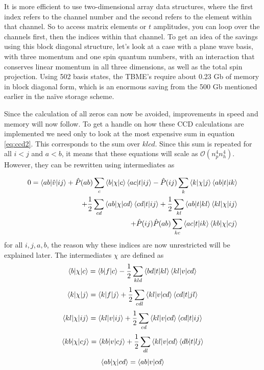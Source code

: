   It is more efficient to use two-dimensional array data
  structures, where the first index refers to the channel number and
  the second refers to the element within that channel. So to access
  matrix elements or $t$ amplitudes, you can loop over the channels
  first, then the indices within that channel. To get an idea of the
  savings using this block diagonal structure, let's look at a case
  with a plane wave basis, with three momentum and one spin quantum
  numbers, with an interaction that conserves linear momentum in all
  three dimensions, as well as the total spin projection. Using 502
  basis states, the TBME's require about 0.23 Gb of memory in block
  diagonal form, which is an enormous saving from the 500 Gb mentioned
  earlier in the na\"ive storage scheme.


  Since the calculation of all  zeros can now be avoided,
  improvements in speed and memory will now follow. To get a handle on
  how these CCD calculations are implemented we need only to look at the
  most expensive sum in equation \ref{eq:ccd2}. This corresponds to
  the sum over $klcd$. Since this sum is repeated for all $i < j$ and
  $a < b$, it means that these equations will scale as
  $\mathcal{O}(n_{p}^{4} n_{h}^{4})$. However,
  they can be rewritten using intermediates as

  \begin{align}
  0 = \braket{ab|\hat{v}|ij} + \hat{P}(ab) \sum_{c} \braket{b| \chi
    |c} \braket{ac| t |ij} - \hat{P}(ij) \sum_{k} \braket{k| \chi |j}
  \braket{ab| t |ik} & \nonumber \\ + \frac{1}{2}\sum_{cd} \braket{ab|
    \chi |cd} \braket{cd| t |ij} + \frac{1}{2} \sum_{kl} \braket{ab| t
    |kl} \braket{kl| \chi |ij} \\ + \hat{P}(ij)\hat{P}(ab) \sum_{kc}
  \braket{ac| t |ik}\braket{kb| \chi |cj} & \nonumber
  \end{align}
  for all $i,j,a,b$, the reason why these indices are now unrestricted
  will be explained later. The intermediates $\chi$ are defined as
  \begin{equation}
  \braket{b| \chi |c} = \braket{b|f|c} - \frac{1}{2} \sum_{kld}
  \braket{bd|t|kl} \braket{kl|v|cd}
  \end{equation}
  \begin{equation}
  \braket{k| \chi |j} = \braket{k|f|j} + \frac{1}{2} \sum_{cdl}
  \braket{kl|v|cd} \braket{cd|t|jl}
  \end{equation}
  \begin{equation}
  \braket{kl| \chi |ij} = \braket{kl|v|ij} + \frac{1}{2} \sum_{cd}
  \braket{kl|v|cd} \braket{cd|t|ij}
  \label{eq:mtxEx}
  \end{equation}
  \begin{equation}
  \braket{kb| \chi |cj} = \braket{kb|v|cj} + \frac{1}{2} \sum_{dl}
  \braket{kl|v|cd} \braket{db|t|lj}
  \end{equation}
  \begin{equation}
  \braket{ab| \chi |cd} = \braket{ab|v|cd}
  \end{equation}


